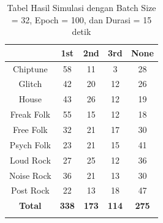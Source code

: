 \begin{longtable}[c]{|c|c|c|c|c|}
	\hline
	\textbf{}      & \textbf{1st} & \textbf{2nd} & \textbf{3rd} & \textbf{None} \\ \hline
	\endfirsthead
	\endhead
	Chiptune       & 58           & 11           & 3            & 28            \\ \hline
	Glitch         & 42           & 20           & 12           & 26            \\ \hline
	House          & 43           & 26           & 12           & 19            \\ \hline
	Freak Folk     & 55           & 15           & 12           & 18            \\ \hline
	Free Folk      & 32           & 21           & 17           & 30            \\ \hline
	Psych Folk     & 23           & 21           & 15           & 41            \\ \hline
	Loud Rock      & 27           & 25           & 12           & 36            \\ \hline
	Noise Rock     & 36           & 21           & 13           & 30            \\ \hline
	Post Rock      & 22           & 13           & 18           & 47            \\ \hline
	\textbf{Total} & \textbf{338} & \textbf{173} & \textbf{114} & \textbf{275}  \\ \hline
	\caption{Tabel Hasil Simulasi dengan Batch Size = 32, Epoch = 100, dan Durasi = 15 detik}
	\label{tab:my-table}\\
\end{longtable}

